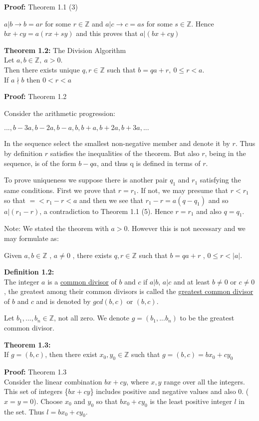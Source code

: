 \documentclass[a4paper]{article}
\begin{document}
\textbf{Proof:} Theorem 1.1 (3)

$a|b \rightarrow b=ar$ for some $r\in \mathbb{Z}$ and $a|c \rightarrow c=as$ for some $s\in \mathbb{Z}$. Hence $bx+cy=a(rx+sy)$ and this proves that $a|(bx+cy)$


\textbf{Theorem 1.2:} The Division Algorithm\\
Let $a,b\in\mathbb{Z},\ a>0$.\\
Then there exists unique $q,r\in\mathbb{Z}$ such that $b=qa+r,\ 0\leq r<a$.\\
If $a\nmid b$ then $0<r<a$

\textbf{Proof:} Theorem 1.2

Consider the arithmetic progression:

$...,b-3a,b-2a,b-a,b,b+a,b+2a,b+3a,...$

In the sequence select the smallest non-negative member and denote it by $r$. Thus by definition $r$ satisfies the inequalities of the theorem. But also $r$, being in the sequence, is of the form $b-qa$, and thus q is defined in terms of $r$.

To prove uniqueness we suppose there is another pair $q_1$ and $r_1$ satisfying the same conditions. First we prove that $r=r_1$. If not, we may presume that $r<r_1$ so that $=<r_1-r<a$ and then we see that $r_1-r=a(q-q_1)$ and so $a|(r_1-r)$, a contradiction to Theorem 1.1 (5). Hence $r=r_1$ and also $q=q_1$.

Note: We stated the theorem with $a>0$. However this is not necessary and we may formulate as:

Given $a,b\in\mathbb{Z}$ , $a\neq 0$ , there exists $q,r\in\mathbb{Z}$ such that $b=qa+r$ , $0\leq r < |a|$.


\textbf{Definition 1.2:}\\
The integer $a$ is a \underline{common divisor} of $b$ and $c$ if $a|b$, $a|c$ and at least $b\neq0$ or $c\neq0$, the greatest among their common divisors is called the \underline{greatest common divisor} of $b$ and $c$ and is denoted by $gcd(b,c)$ or $(b,c)$.

Let $b_1,...,b_n\in\mathbb{Z}$, not all zero. We denote $g=(b_1,...b_n)$ to be the greatest common divisor.

\textbf{Theorem 1.3:}\\
If $g=(b,c)$, then there exist $x_0,y_0\in\mathbb{Z}$ such that $g=(b,c)=bx_0+cy_0$

\textbf{Proof:} Theorem 1.3\\
Consider the linear combination $bx+cy$, where $x,y$ range over all the integers. This set of integers \{$bx+cy$\} includes positive and negative values and also 0. ($x=y=0$). Choose $x_0$ and $y_0$ so that $bx_0+cy_0$ is the least positive integer $l$ in the set. Thus $l=bx_0+cy_0$.
\end{document}
